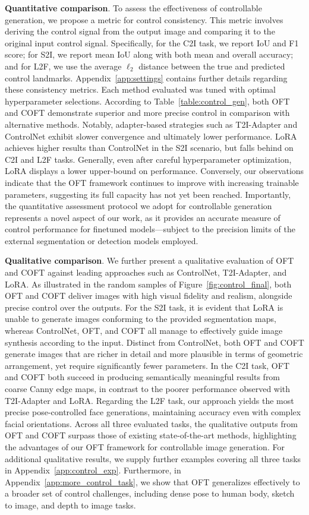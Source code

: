 \textbf{Quantitative comparison}. To assess the effectiveness of controllable generation, we propose a metric for control consistency. This metric involves deriving the control signal from the output image and comparing it to the original input control signal. Specifically, for the C2I task, we report IoU and F1 score; for S2I, we report mean IoU along with both mean and overall accuracy; and for L2F, we use the average $\ell_2$ distance between the true and predicted control landmarks. Appendix~\ref{app:settings} contains further details regarding these consistency metrics. Each method evaluated was tuned with optimal hyperparameter selections. According to Table~\ref{table:control_gen}, both OFT and COFT demonstrate superior and more precise control in comparison with alternative methods. Notably, adapter-based strategies such as T2I-Adapter and ControlNet exhibit slower convergence and ultimately lower performance. LoRA achieves higher results than ControlNet in the S2I scenario, but falls behind on C2I and L2F tasks. Generally, even after careful hyperparameter optimization, LoRA displays a lower upper-bound on performance. Conversely, our observations indicate that the OFT framework continues to improve with increasing trainable parameters, suggesting its full capacity has not yet been reached. Importantly, the quantitative assessment protocol we adopt for controllable generation represents a novel aspect of our work, as it provides an accurate measure of control performance for finetuned models—subject to the precision limits of the external segmentation or detection models employed.

\textbf{Qualitative comparison}. We further present a qualitative evaluation of OFT and COFT against leading approaches such as ControlNet, T2I-Adapter, and LoRA. As illustrated in the random samples of Figure~\ref{fig:control_final}, both OFT and COFT deliver images with high visual fidelity and realism, alongside precise control over the outputs. For the S2I task, it is evident that LoRA is unable to generate images conforming to the provided segmentation maps, whereas ControlNet, OFT, and COFT all manage to effectively guide image synthesis according to the input. Distinct from ControlNet, both OFT and COFT generate images that are richer in detail and more plausible in terms of geometric arrangement, yet require significantly fewer parameters. In the C2I task, OFT and COFT both succeed in producing semantically meaningful results from coarse Canny edge maps, in contrast to the poorer performance observed with T2I-Adapter and LoRA. Regarding the L2F task, our approach yields the most precise pose-controlled face generations, maintaining accuracy even with complex facial orientations. Across all three evaluated tasks, the qualitative outputs from OFT and COFT surpass those of existing state-of-the-art methods, highlighting the advantages of our OFT framework for controllable image generation. For additional qualitative results, we supply further examples covering all three tasks in Appendix~\ref{app:control_exp}. Furthermore, in Appendix~\ref{app:more_control_task}, we show that OFT generalizes effectively to a broader set of control challenges, including dense pose to human body, sketch to image, and depth to image tasks.

